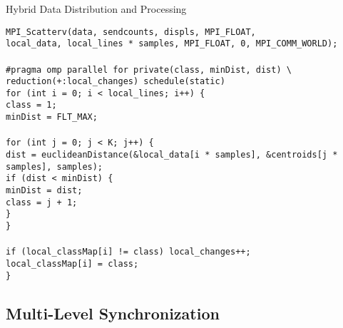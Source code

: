 \documentclass[12pt,a4paper]{article}
\begin{document}
\begin{algorithm}[H]
\caption{Hybrid Data Distribution and Processing}
\label{alg:hybrid_processing}
\begin{flushleft}
\texttt{MPI\_Scatterv(data, sendcounts, displs, MPI\_FLOAT,}\\
\hspace{5cm}\texttt{local\_data, local\_lines * samples, MPI\_FLOAT, 0, MPI\_COMM\_WORLD);}\\
\\
\texttt{\#pragma omp parallel for private(class, minDist, dist) \textbackslash}\\
\hspace{1cm}\texttt{reduction(+:local\_changes) schedule(static)}\\
\texttt{for (int i = 0; i < local\_lines; i++) \{}\\
\hspace{1cm}\texttt{class = 1;}\\
\hspace{1cm}\texttt{minDist = FLT\_MAX;}\\
\\
\hspace{1cm}\texttt{for (int j = 0; j < K; j++) \{}\\
\hspace{2cm}\texttt{dist = euclideanDistance(\&local\_data[i * samples], \&centroids[j * samples], samples);}\\
\hspace{2cm}\texttt{if (dist < minDist) \{}\\
\hspace{3cm}\texttt{minDist = dist;}\\
\hspace{3cm}\texttt{class = j + 1;}\\
\hspace{2cm}\texttt{\}}\\
\hspace{1cm}\texttt{\}}\\
\\
\hspace{1cm}\texttt{if (local\_classMap[i] != class) local\_changes++;}\\
\hspace{1cm}\texttt{local\_classMap[i] = class;}\\
\texttt{\}}
\end{flushleft}
\end{algorithm}

\subsection{Multi-Level Synchronization}
\end{document}

